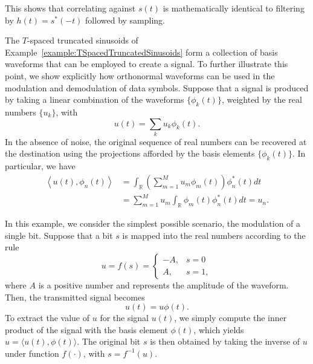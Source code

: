 This shows that correlating against $s(t)$ is mathematically identical to filtering by $h(t) = s^* (-t)$ followed by sampling.

\iffalse
The $T$-spaced truncated sinusoids of Example~\ref{example:TSpacedTruncatedSinusoids} form a collection of basis waveforms that can be employed to create a signal.
To further illustrate this point, we show explicitly how orthonormal waveforms can be used in the modulation and demodulation of data symbols.
Suppose that a signal is produced by taking a linear combination of the waveforms $\{ \phi_k(t) \}$, weighted by the real numbers $\{ u_k \}$, with
\begin{equation*}
u(t) = \sum_{k} u_k \phi_k(t) .
\end{equation*}
In the absence of noise, the original sequence of real numbers can be recovered at the destination using the projections afforded by the basis elements $\{ \phi_k (t) \}$.
In particular, we have
\begin{equation*}
\begin{split}
\left\langle u(t), \phi_n(t) \right\rangle
&= \int_{\mathbb{R}}
\left( \sum_{m=1}^M u_m \phi_m(t) \right) \phi_n^*(t) dt \\
&= \sum_{m=1}^M u_m \int_{\mathbb{R}}
\phi_m(t) \phi_n^*(t) dt
= u_n .
\end{split}
\end{equation*}

\begin{example}
In this example, we consider the simplest possible scenario, the modulation of a single bit.
Suppose that a bit $s$ is mapped into the real numbers according to the rule
\begin{equation*}
u = f(s) = \begin{cases} -A, & s = 0 \\
A, & s = 1 , \end{cases}
\end{equation*}
where $A$ is a positive number and represents the amplitude of the waveform.
Then, the transmitted signal becomes
\begin{equation*}
u(t) = u \phi (t) .
\end{equation*}
To extract the value of $u$ for the signal $u(t)$, we simply compute the inner product of the signal with the basis element $\phi(t)$, which yields $u = \langle u(t), \phi(t) \rangle$.
The original bit $s$ is then obtained by taking the inverse of $u$ under function $f(\cdot)$, with $s = f^{-1} (u)$.
\end{example}

